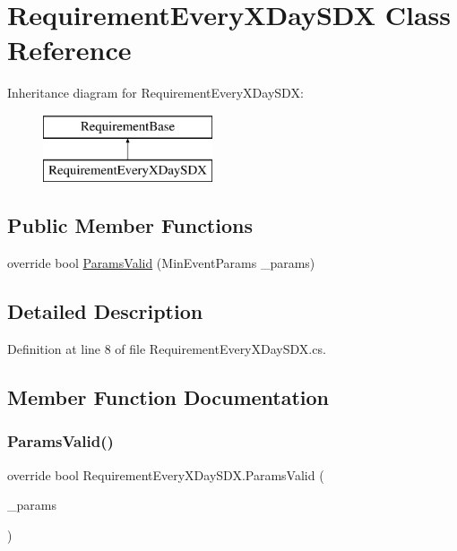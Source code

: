 \hypertarget{class_requirement_every_x_day_s_d_x}{}\section{Requirement\+Every\+X\+Day\+S\+DX Class Reference}
\label{class_requirement_every_x_day_s_d_x}
Inheritance diagram for Requirement\+Every\+X\+Day\+S\+DX\+:\begin{figure}[H]
\begin{center}
\leavevmode
\includegraphics[height=2.000000cm]{class_requirement_every_x_day_s_d_x}
\end{center}
\end{figure}
\subsection*{Public Member Functions}
\begin{DoxyCompactItemize}
\item 
override bool \mbox{\hyperlink{class_requirement_every_x_day_s_d_x_a6d832bc33f2b67dab829ae5718de5f65}{Params\+Valid}} (Min\+Event\+Params \+\_\+params)
\end{DoxyCompactItemize}


\subsection{Detailed Description}


Definition at line 8 of file Requirement\+Every\+X\+Day\+S\+D\+X.\+cs.



\subsection{Member Function Documentation}
\mbox{\label{class_requirement_every_x_day_s_d_x_a6d832bc33f2b67dab829ae5718de5f65}} 
\subsubsection{\texorpdfstring{ParamsValid()}{ParamsValid()}}
{\footnotesize\ttfamily override bool Requirement\+Every\+X\+Day\+S\+D\+X.\+Params\+Valid (\begin{DoxyParamCaption}\item[{Min\+Event\+Params}]{\+\_\+params }\end{DoxyParamCaption})}



